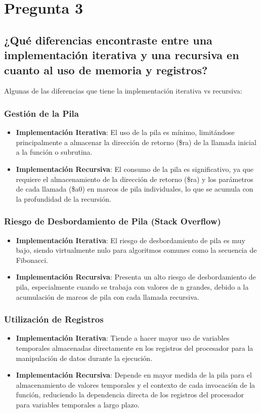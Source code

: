 \documentclass{article}
\begin{document}
\section*{Pregunta 3}
\subsection*{¿Qué diferencias encontraste entre una implementación iterativa y una recursiva en cuanto al uso de memoria y registros?}

Algunas de las diferencias que tiene la implementación iterativa vs recursiva:

\subsubsection*{Gestión de la Pila}
\begin{itemize}
\item \textbf{Implementación Iterativa}: El uso de la pila es mínimo, limitándose principalmente a almacenar la dirección de retorno (\$ra) de la llamada inicial a la función o subrutina.
\item \textbf{Implementación Recursiva}: El consumo de la pila es significativo, ya que requiere el almacenamiento de la dirección de retorno (\$ra) y los parámetros de cada llamada (\$a0) en marcos de pila individuales, lo que se acumula con la profundidad de la recursión.
\end{itemize}

\subsubsection*{Riesgo de Desbordamiento de Pila (Stack Overflow)}
\begin{itemize}
\item \textbf{Implementación Iterativa}: El riesgo de desbordamiento de pila es muy bajo, siendo virtualmente nulo para algoritmos comunes como la secuencia de Fibonacci.
\item \textbf{Implementación Recursiva}: Presenta un alto riesgo de desbordamiento de pila, especialmente cuando se trabaja con valores de n grandes, debido a la acumulación de marcos de pila con cada llamada recursiva.
\end{itemize}

\subsubsection*{Utilización de Registros}
\begin{itemize}
\item \textbf{Implementación Iterativa}: Tiende a hacer mayor uso de variables temporales almacenadas directamente en los registros del procesador para la manipulación de datos durante la ejecución.
\item \textbf{Implementación Recursiva}: Depende en mayor medida de la pila para el almacenamiento de valores temporales y el contexto de cada invocación de la función, reduciendo la dependencia directa de los registros del procesador para variables temporales a largo plazo.
\end{itemize}
\end{document}
